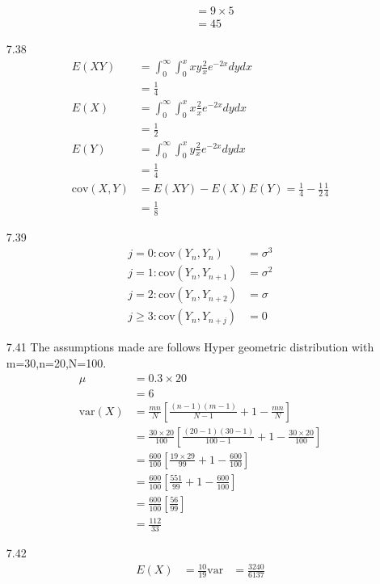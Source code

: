 \documentclass{article}
\begin{document}
\begin{itemize}
\begin{itemize}
\begin{align*}
            &=9\times 5\\
            &=45
        \end{align*}
    \end{itemize}
    \item [7.38]
    \begin{align*}
        E(XY)&=\int_{0}^{\infty}\int_{0}^{x}xy\frac{2}{x}e^{-2x}dydx\\
        &=\frac{1}{4}\\
        E(X)&=\int_{0}^{\infty}\int_{0}^{x}x\frac{2}{x}e^{-2x}dydx\\
        &=\frac{1}{2}\\
        E(Y)&=\int_{0}^{\infty}\int_{0}^{x}y\frac{2}{x}e^{-2x}dydx\\
        &=\frac{1}{4}\\
        \text{cov}(X,Y)&=E(XY)-E(X)E(Y)=\frac{1}{4}-\frac{1}{2}\frac{1}{4}\\
        &=\frac{1}{8}
    \end{align*}
    \item [7.39]
    \begin{align*}
        j=0: \text{cov}(Y_n,Y_{n})&=\sigma^3\\
        j=1: \text{cov}(Y_n,Y_{n+1})&=\sigma^2\\
        j=2: \text{cov}(Y_n,Y_{n+2})&=\sigma\\
        j\geq 3: \text{cov}(Y_n,Y_{n+j})&=0
    \end{align*}
    \item [7.41]The assumptions made are 
    follows Hyper geometric distribution with m=30,n=20,N=100.
    \begin{align*}
        \mu &=0.3\times 20\\
        &=6\\
        \text{var}(X)&=\frac{mn}{N} \left[ \frac{(n-1)(m-1)}{N-1} + 1 - \frac{mn}{N} \right] \\
        &= \frac{30 \times 20}{100} \left[ \frac{(20 - 1)(30 - 1)}{100 - 1} + 1 - \frac{30 \times 20}{100} \right] \\
        &= \frac{600}{100} \left[ \frac{19 \times 29}{99} + 1 - \frac{600}{100} \right] \\
        &= \frac{600}{100} \left[ \frac{551}{99} + 1 - \frac{600}{100} \right] \\
        &= \frac{600}{100} \left[ \frac{56}{99} \right] \\
        &= \frac{112}{33}
    \end{align*}
    \item [7.42]
    \begin{align*}
        E(X)&=\frac{10}{19}
        \text{var}&=\frac{3240}{6137}
    \end{align*}
\end{itemize}
\end{document}
